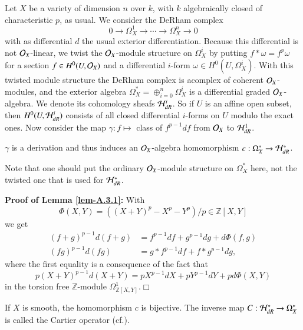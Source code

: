 Let $X$ be a variety of dimension $n$ over $k$, with $k$ algebraically
closed of characteristic $p$, as usual. We consider the DeRham complex
$$
0 \to \Omega^{1}_{X}\to \cdots \to \Omega^{n}_{X}\to 0
$$
with as differential $d$ the usual exterior differentiation. Because
this differential is not $\mathcal{O}_{X}$-linear, we twist the $\mathcal{O}_{X}$-module
structure on $\Omega^{i}_{X}$ by putting $f\ast \omega=f^{p}\omega$
for a section $f\in H^{0}(U,\mathcal{O}_{X})$ and a differential $i$-form
$\omega\in H^{0}(U,\Omega^{i}_{X})$. With this twisted module
structure the DeRham complex is a\pageoriginale complex\label{page83} of coherent
$\mathcal{O}_{X}$-modules, and the exterior algebra
$\Omega^{*}_{X}=\oplus^{n}_{i=0}\Omega^{i}_{X}$ is a differential
graded $\mathcal{O}_{X}$-algebra. We denote its cohomology sheafs
$\mathcal{H}^{i}_{dR}$. So if $U$ is an affine open subset, then
$H^{0}(U,\mathcal{H}^{i}_{dR})$ consists of all closed differential $i$-forms
on $U$ modulo the exact ones. Now consider the map $\gamma:f\mapsto$
class of $f^{p-1}df$ from $\mathcal{O}_{X}$ to $\mathcal{H}^{1}_{dR}$. 

\begin{lemma}\label{lem-A.3.1}
$\gamma$ is a derivation and thus induces an $\mathcal{O}_{X}$-algebra
  homomorphism $c:\Omega^{*}_{X}\to \mathcal{H}^{*}_{dR}$.
\end{lemma}

\begin{remark}\label{rem-A.3.2}
Note that one should put the ordinary $\mathcal{O}_{X}$-module structure on
$\Omega^{*}_{X}$ here, not the twisted one that is used for
$\mathcal{H}^{*}_{dR}$. 
\end{remark}

\noindent
{\bf Proof of Lemma \ref{lem-A.3.1}:} With
$$
\Phi(X,Y)=((X+Y)^{p}-X^{p}-Y^{p})/p\in \mathbb{Z}[X,Y]
$$
we get
\begin{align*}
(f+g)^{p-1}d(f+g) &= f^{p-1}df+g^{p-1}dg+d\Phi(f,g)\\
(fg)^{p-1}d(fg) &= g\ast f^{p-1}df+f\ast g^{p-1}dg,
\end{align*}
where the first equality is a consequence of the fact that
$$
p(X+Y)^{p-1}d(X+Y)=pX^{p-1}dX+pY^{p-1}dY+pd\Phi(X,Y)
$$
in the torsion free $\mathbb{Z}$-module
$\Omega^{1}_{\mathbb{Z}[X,Y]}$.\hfill$\Box$ 

\begin{proposition}\label{prop-A.3.3}
If $X$ is smooth, the homomorphism $c$ is bijective. The inverse map
$C:\mathcal{H}^{*}_{dR}\to \Omega^{*}_{X}$ is called the Cartier
operator 
(cf.\@ \cite{key26}).
\end{proposition}

